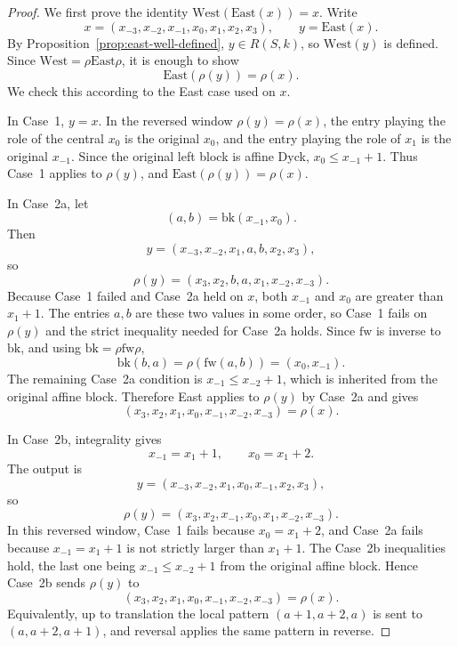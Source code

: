 \documentclass[11pt]{article}
\theoremstyle{plain}
\theoremstyle{definition}
\theoremstyle{remark}
\begin{document}
\begin{proof}
We first prove the identity \(\mathrm{West}(\mathrm{East}(x))=x\). Write
\[
  x=(x_{-3},x_{-2},x_{-1},x_0,x_1,x_2,x_3),
  \qquad
  y=\mathrm{East}(x).
\]
By Proposition~\ref{prop:east-well-defined}, \(y\in R(S,k)\), so
\(\mathrm{West}(y)\) is defined. Since \(\mathrm{West}=\rho\mathrm{East}\rho\),
it is enough to show
\[
  \mathrm{East}(\rho(y))=\rho(x).
\]
We check this according to the East case used on \(x\).

In Case~1, \(y=x\). In the reversed window \(\rho(y)=\rho(x)\), the entry
playing the role of the central \(x_0\) is the original \(x_0\), and the entry
playing the role of \(x_1\) is the original \(x_{-1}\). Since the original
left block is affine Dyck, \(x_0\le x_{-1}+1\). Thus Case~1 applies to
\(\rho(y)\), and \(\mathrm{East}(\rho(y))=\rho(x)\).

In Case~2a, let
\[
  (a,b)=\mathrm{bk}(x_{-1},x_0).
\]
Then
\[
  y=(x_{-3},x_{-2},x_1,a,b,x_2,x_3),
\]
so
\[
  \rho(y)=(x_3,x_2,b,a,x_1,x_{-2},x_{-3}).
\]
Because Case~1 failed and Case~2a held on \(x\), both \(x_{-1}\) and \(x_0\)
are greater than \(x_1+1\). The entries \(a,b\) are these two values in some
order, so Case~1 fails on \(\rho(y)\) and the strict inequality needed for
Case~2a holds. Since \(\mathrm{fw}\) is inverse to \(\mathrm{bk}\), and using
\(\mathrm{bk}=\rho\mathrm{fw}\rho\),
\[
  \mathrm{bk}(b,a)=\rho(\mathrm{fw}(a,b))=(x_0,x_{-1}).
\]
The remaining Case~2a condition is \(x_{-1}\le x_{-2}+1\), which is inherited
from the original affine block. Therefore East applies to \(\rho(y)\) by
Case~2a and gives
\[
  (x_3,x_2,x_1,x_0,x_{-1},x_{-2},x_{-3})=\rho(x).
\]

In Case~2b, integrality gives
\[
  x_{-1}=x_1+1,
  \qquad
  x_0=x_1+2.
\]
The output is
\[
  y=(x_{-3},x_{-2},x_1,x_0,x_{-1},x_2,x_3),
\]
so
\[
  \rho(y)=(x_3,x_2,x_{-1},x_0,x_1,x_{-2},x_{-3}).
\]
In this reversed window, Case~1 fails because \(x_0=x_1+2\), and Case~2a
fails because \(x_{-1}=x_1+1\) is not strictly larger than \(x_1+1\). The
Case~2b inequalities hold, the last one being \(x_{-1}\le x_{-2}+1\) from the
original affine block. Hence Case~2b sends \(\rho(y)\) to
\[
  (x_3,x_2,x_1,x_0,x_{-1},x_{-2},x_{-3})=\rho(x).
\]
Equivalently, up to translation the local pattern \((a+1,a+2,a)\) is sent to
\((a,a+2,a+1)\), and reversal applies the same pattern in reverse.


\end{proof}
\end{document}
